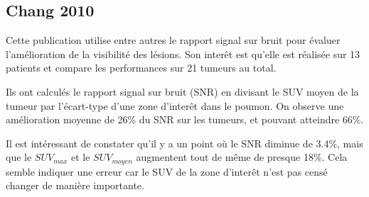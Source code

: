\subsection{Chang 2010}

Cette publication utilise entre autres le rapport signal sur bruit pour évaluer l'amélioration de la visibilité des lésions. Son interêt est qu'elle est réalisée sur 13 patients et compare les performances sur 21 tumeurs au total.

Ils ont calculés le rapport signal sur bruit (SNR) en divisant le SUV moyen de la tumeur par l'écart-type d'une zone d'interêt dans le poumon. On observe une amélioration moyenne de 26\% du SNR sur les tumeurs, et pouvant atteindre 66\%.

Il est intéressant de constater qu'il y a un point où le SNR diminue de 3.4\%, mais que le $SUV_{max}$ et le $SUV_{moyen}$ augmentent tout de même de presque 18\%. Cela semble indiquer une erreur car le SUV de la zone d'interêt n'est pas censé changer de manière importante.
